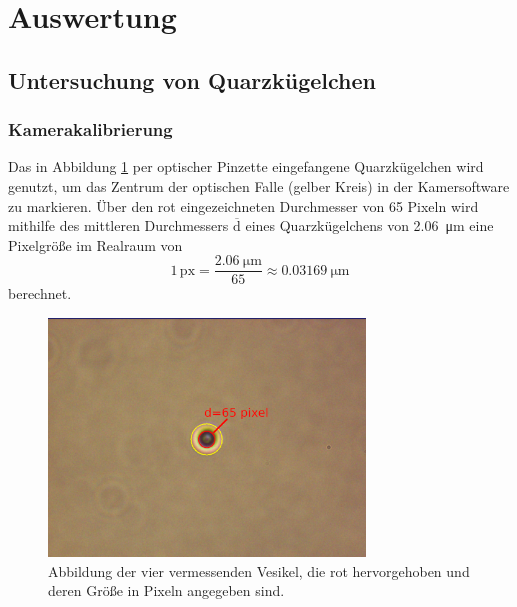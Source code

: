 \newpage
\section{Auswertung}

    \subsection{Untersuchung von Quarzkügelchen}
        \subsubsection{Kamerakalibrierung}
            Das in Abbildung \ref{fig:cal_cam} per optischer Pinzette eingefangene Quarzkügelchen wird genutzt, um das Zentrum der optischen Falle (gelber Kreis) in der Kamersoftware zu markieren. Über den
            rot eingezeichneten Durchmesser von 65 Pixeln wird mithilfe des mittleren Durchmessers $\overline{\text{d}}$ eines Quarzkügelchens von \SI{2.06}{\micro\metre} eine Pixelgröße im Realraum von 
            \begin{equation*}
                1\,\text{px} = \frac{\SI{2.06}{\micro\metre}}{65} \approx \SI{0.03169}{\micro\metre}
            \end{equation*}
            berechnet.
            \begin{figure}[h]
            \centering
            \includegraphics[width = 0.75\textwidth]{pictures/cal_cam.png}
            \caption{Abbildung der vier vermessenden Vesikel, die rot hervorgehoben und deren Größe in Pixeln angegeben sind.}
            \label{fig:cal_cam}
            \end{figure}
            \FloatBarrier


